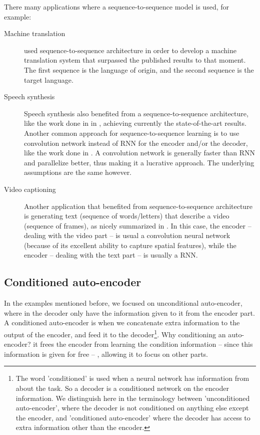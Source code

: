    \par There many applications where a sequence-to-sequence model is used, for example:
    \begin{description}
      \item [Machine translation] \citep{sutskever2014sequence} used sequence-to-sequence architecture in order to develop a machine translation system that surpassed the published results to that moment. The first sequence is the language of origin, and the second sequence is the target language.
      \item [Speech synthesis] Speech synthesis also benefited from a sequence-to-sequence architecture, like the work done in in \citep{oord2016wavenet,wang2017tacotron}, achieving currently the state-of-the-art results. Another common approach for sequence-to-sequence learning is to use convolution network instead of RNN for the encoder and/or the decoder, like the work done in \citep{ping2017deep}. A convolution network is generally faster than RNN and parallelize better, thus making it a lucrative approach. The underlying assumptions are the same however.
      \item [Video captioning] Another application that benefited from sequence-to-sequence architecture is generating text (sequence of words/letters) that describe a video (sequence of frames), as nicely summarized in \citep{aafaq2018video}. In this case, the encoder -- dealing with the video part -- is usual a convolution neural network (because of its excellent ability to capture spatial features), while the encoder -- dealing with the text part -- is usually a RNN.
    \end{description}

  \subsection{Conditioned auto-encoder}
    \par In the examples mentioned before, we focused on unconditional auto-encoder, where in the decoder only have the information given to it from the encoder part. A conditioned auto-encoder is when we concatenate extra information to the output of the encoder, and feed it to the decoder\footnote{The word 'conditioned' is used when a neural network has information from about the task. So a decoder is a conditioned network on the encoder information. We distinguish here in the terminology between 'unconditioned auto-encoder', where the decoder is not conditioned on anything else except the encoder, and 'conditioned auto-encoder' where the decoder has access to extra information other than the encoder.}. Why conditioning an auto-encoder? it frees the encoder from learning the condition information -- since this information is given for free -- , allowing it to focus on other parts.

